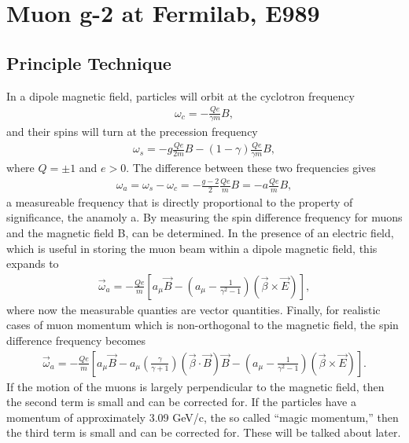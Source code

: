 \thispagestyle{myheadings} %

\graphicspath{ {Body/Figures/ExperimentalOverview/Decay/} {Body/Figures/TrackingFigures/TrackerPics/} {Body/Figures/ExperimentalOverview/Ring/} }

\chapter{Muon g-2 at Fermilab, E989}
\label{chapter:Muon g-2 at Fermilab, E989}

\section{Principle Technique}
\label{sec:PrincipleTechnique}

In a dipole magnetic field, particles will orbit at the cyclotron frequency 
        \begin{align} \label{eq:wc}
        	\omega_{c} = -\frac{Qe}{\gamma m}B,
        \end{align}
and their spins will turn at the precession frequency
        \begin{align} \label{eq:ws}
        	\omega_{s} = -g\frac{Qe}{2m}B - (1-\gamma)\frac{Qe}{\gamma m}B,
        \end{align}
where $Q = \pm 1$ and $e > 0$. The difference between these two frequencies gives
        \begin{align} \label{eq:wasimple}
        	\omega_{a} = \omega_{s} - \omega_{c} = -\frac{g-2}{2}\frac{Qe}{m}B = - a \frac{Qe}{m}B,
        \end{align}
a measureable frequency that is directly proportional to the property of significance, the anamoly a. By measuring the spin difference frequency for muons and the magnetic field B, \amu can be determined. In the presence of an electric field, which is useful in storing the muon beam within a dipole magnetic field, this expands to 
        \begin{align} \label{eq:waelectric}
            \vec{\omega}_{a} = -\frac{Qe}{m} [a_{\mu}\vec{B} - (a_{\mu} - \frac{1}{\gamma^{2}-1})(\vec{\beta} \times \vec{E}) ],
        \end{align}
where now the measurable quanties are vector quantities. Finally, for realistic cases of muon momentum which is non-orthogonal to the magnetic field, the spin difference frequency becomes
        \begin{align} \label{eq:wafinal}
            \vec{\omega}_{a} = -\frac{Qe}{m} [a_{\mu}\vec{B} - a_{\mu} (\frac{\gamma}{\gamma+1})(\vec{\beta} \cdot \vec{B})\vec{B} - (a_{\mu} - \frac{1}{\gamma^{2}-1})(\vec{\beta} \times \vec{E}) ].
        \end{align}
If the motion of the muons is largely perpendicular to the magnetic field, then the second term is small and can be corrected for. If the particles have a momentum of approximately 3.09 GeV/c, the so called ``magic momentum,'' then the third term is small and can be corrected for. These will be talked about later.

